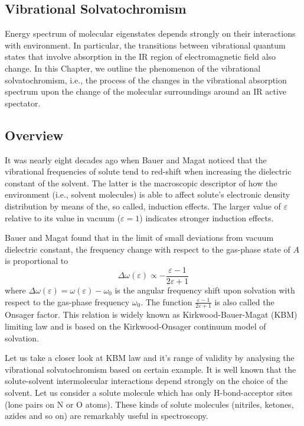 \documentclass[b5paper,oneside,fleqn,11pt]{book}
\begin{document}
\begin{refsection}
\chapter{Vibrational Solvatochromism\label{c:vibr-solv}}

Energy spectrum of molecular eigenstates
depends strongly on their interactions with environment. In particular,
the transitions between vibrational quantum states
that involve absorption in the IR region of 
electromagnetic field also change. 
In this Chapter, we outline the phenomenon 
of the vibrational solvatochromism, i.e., the process of
the changes in the vibrational absorption spectrum upon the change 
of the molecular surroundings around an IR active spectator.

\section{Overview}
%
It was nearly eight decades ago when Bauer and Magat noticed 
that the vibrational frequencies
of solute tend to red-shift when
increasing the dielectric constant of the solvent. \citep{Bauer.Magat.JPhysRadium.1938} 
The latter is the macroscopic descriptor 
of how the environment (i.e., solvent molecules) is able to affect solute's 
electronic density distribution by means of the, so called, induction
effects. The larger value of $\varepsilon$ relative to its value in vacuum
($\varepsilon=1$) indicates stronger induction effects. 

Bauer and Magat found that in the limit of small deviations
from vacuum dielectric constant, the frequency change with respect to the
gas-phase state of $A$ is proportional to
%
\begin{equation} \label{e:kbm}
\Delta \omega(\varepsilon) \propto - \frac{\varepsilon-1}{2\varepsilon+1}
\end{equation}
%
where $\Delta\omega(\varepsilon) = \omega(\varepsilon) - \omega_0$ is the
angular frequency shift upon solvation with respect to the gas-phase frequency
$\omega_0$. The function $\frac{\varepsilon-1}{2\varepsilon+1}$ is also called
the Onsager factor. This relation is widely known as Kirkwood-Bauer-Magat (KBM) 
limiting law and is based on the Kirkwood-Onsager continuum model of 
solvation. \citep{Kirkwood.JCP.1934,Onsager.JACS.1936}

Let us take a closer look at KBM law and it's range of validity by analysing the vibrational
solvatochromism based on certain example. It is well known that 
the solute\hyp{}solvent intermolecular interactions 
depend strongly on the choice of the solvent. \citep{Stone.TheTheoryOfIntermolecularForces.1996,Gutmann.Resch.Linert.CoordChemRev.1982} 
Let us consider a solute molecule which has
only H\hyp{}bond\hyp{}acceptor sites (lone pairs on N or O atoms). These kinds of solute molecules
(nitriles, ketones, azides and so on) are remarkably useful in spectroscopy.


\end{refsection}
\end{document}
